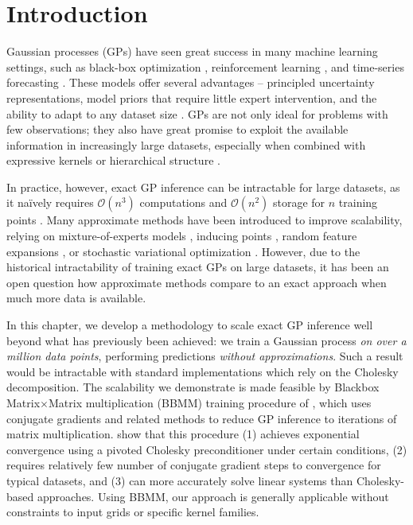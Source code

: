 \section{Introduction}
Gaussian processes (GPs) have seen great success in many machine learning settings, such as black-box optimization \citep{snoek2012practical}, reinforcement learning \cite{deisenroth2011pilco,deisenroth2015gaussian}, and time-series forecasting \cite{roberts2013gaussian}.
These models offer several advantages -- principled uncertainty representations, model priors that require little expert intervention, and the ability to adapt to any dataset size \citep{rasmussen2001occam,rasmussen2006gaussian}.
GPs are not only ideal for problems with few observations; they also have great
promise to exploit the available information in increasingly large datasets,
especially when combined with expressive kernels \cite{wilson2013gaussian} or
hierarchical structure \cite{wilson2012gaussian, damianou2013deep,wilson2016deep,salimbeni2017doubly}.

In practice, however, exact GP inference can be intractable for large datasets, as it na\"ively requires $\mathcal{O}(n^3)$ computations and $\mathcal{O}(n^2)$ storage for $n$ training points \cite{rasmussen2006gaussian}.
Many approximate methods have been introduced to improve scalability, relying on mixture-of-experts models \cite{deisenroth2015distributed}, inducing points \citep{snelson2006sparse,titsias2009variational,wilson2015kernel,gardner2018product},
random feature expansions \cite{rahimi2008random,le2013fastfood,yang2015carte},
or stochastic variational optimization \citep{hensman2013gaussian,hensman2015scalable,wilson2016stochastic,cheng2017variational,salimbeni2018orthogonally}.
However, due to the historical intractability of training exact GPs on large datasets, it
has been an open question how approximate methods compare to an exact approach when much more data is available.

In this chapter, we develop a methodology to scale exact GP inference well beyond what has previously been achieved:
we train a Gaussian process \emph{on over a million data points}, performing predictions \emph{without approximations}.
Such a result would be intractable with standard implementations which rely on the Cholesky decomposition.
The scalability we demonstrate is made feasible by Blackbox Matrix$\times$Matrix multiplication (BBMM) training procedure of \citet{gardner2018gpytorch}, which uses conjugate gradients and related methods to reduce GP inference to iterations of matrix multiplication.
\citet{gardner2018gpytorch} show that this procedure (1) achieves exponential convergence using a pivoted Cholesky preconditioner under certain conditions, (2) requires relatively few number of conjugate gradient steps to convergence for typical datasets, and (3) can more accurately solve linear systems than Cholesky-based approaches. Using BBMM, our approach is generally applicable without constraints to input grids or specific kernel families.

